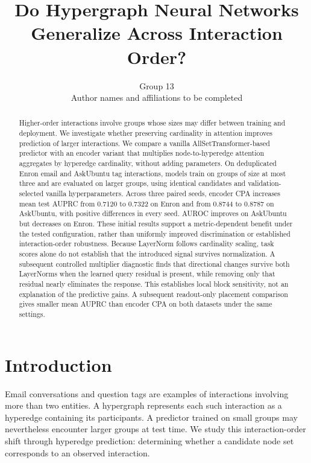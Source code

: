 \documentclass{article}
\title{Do Hypergraph Neural Networks Generalize Across Interaction Order?}
\author{Group 13\\Author names and affiliations to be completed}
\begin{document}
\maketitle
\begin{center}\end{center}


\begin{abstract}
Higher-order interactions involve groups whose sizes may differ between training and deployment. We investigate whether preserving cardinality in attention improves prediction of larger interactions. We compare a vanilla AllSetTransformer-based predictor with an encoder variant that multiplies node-to-hyperedge attention aggregates by hyperedge cardinality, without adding parameters. On deduplicated Enron email and AskUbuntu tag interactions, models train on groups of size at most three and are evaluated on larger groups, using identical candidates and validation-selected vanilla hyperparameters. Across three paired seeds, encoder CPA increases mean test AUPRC from 0.7120 to 0.7322 on Enron and from 0.8744 to 0.8787 on AskUbuntu, with positive differences in every seed. AUROC improves on AskUbuntu but decreases on Enron. These initial results support a metric-dependent benefit under the tested configuration, rather than uniformly improved discrimination or established interaction-order robustness. Because LayerNorm follows cardinality scaling, task scores alone do not establish that the introduced signal survives normalization. A subsequent controlled multiplier diagnostic finds that directional changes survive both LayerNorms when the learned query residual is present, while removing only that residual nearly eliminates the response. This establishes local block sensitivity, not an explanation of the predictive gains. A subsequent readout-only placement comparison gives smaller mean AUPRC than encoder CPA on both datasets under the same settings.
\end{abstract}

\section{Introduction}
Email conversations and question tags are examples of interactions involving more than two entities. A hypergraph represents each such interaction as a hyperedge containing its participants. A predictor trained on small groups may nevertheless encounter larger groups at test time. We study this interaction-order shift through hyperedge prediction: determining whether a candidate node set corresponds to an observed interaction.
\end{document}
